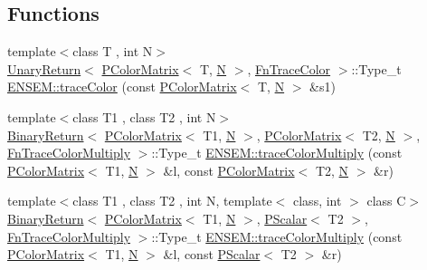 \subsection*{Functions}
\begin{DoxyCompactItemize}
\item 
{\footnotesize template$<$class T , int N$>$ }\\\mbox{\hyperlink{structENSEM_1_1UnaryReturn}{Unary\+Return}}$<$ \mbox{\hyperlink{classENSEM_1_1PColorMatrix}{P\+Color\+Matrix}}$<$ T, \mbox{\hyperlink{operator__name__util_8cc_a7722c8ecbb62d99aee7ce68b1752f337}{N}} $>$, \mbox{\hyperlink{structENSEM_1_1FnTraceColor}{Fn\+Trace\+Color}} $>$\+::Type\+\_\+t \mbox{\hyperlink{group__primcolormatrix_ga00fd94578bee0c90e298c41c144c15ee}{E\+N\+S\+E\+M\+::trace\+Color}} (const \mbox{\hyperlink{classENSEM_1_1PColorMatrix}{P\+Color\+Matrix}}$<$ T, \mbox{\hyperlink{operator__name__util_8cc_a7722c8ecbb62d99aee7ce68b1752f337}{N}} $>$ \&s1)
\item 
{\footnotesize template$<$class T1 , class T2 , int N$>$ }\\\mbox{\hyperlink{structENSEM_1_1BinaryReturn}{Binary\+Return}}$<$ \mbox{\hyperlink{classENSEM_1_1PColorMatrix}{P\+Color\+Matrix}}$<$ T1, \mbox{\hyperlink{operator__name__util_8cc_a7722c8ecbb62d99aee7ce68b1752f337}{N}} $>$, \mbox{\hyperlink{classENSEM_1_1PColorMatrix}{P\+Color\+Matrix}}$<$ T2, \mbox{\hyperlink{operator__name__util_8cc_a7722c8ecbb62d99aee7ce68b1752f337}{N}} $>$, \mbox{\hyperlink{structENSEM_1_1FnTraceColorMultiply}{Fn\+Trace\+Color\+Multiply}} $>$\+::Type\+\_\+t \mbox{\hyperlink{group__primcolormatrix_ga690c734a59a0c81041165c0fe948ef2d}{E\+N\+S\+E\+M\+::trace\+Color\+Multiply}} (const \mbox{\hyperlink{classENSEM_1_1PColorMatrix}{P\+Color\+Matrix}}$<$ T1, \mbox{\hyperlink{operator__name__util_8cc_a7722c8ecbb62d99aee7ce68b1752f337}{N}} $>$ \&l, const \mbox{\hyperlink{classENSEM_1_1PColorMatrix}{P\+Color\+Matrix}}$<$ T2, \mbox{\hyperlink{operator__name__util_8cc_a7722c8ecbb62d99aee7ce68b1752f337}{N}} $>$ \&r)
\item 
{\footnotesize template$<$class T1 , class T2 , int N, template$<$ class, int $>$ class C$>$ }\\\mbox{\hyperlink{structENSEM_1_1BinaryReturn}{Binary\+Return}}$<$ \mbox{\hyperlink{classENSEM_1_1PColorMatrix}{P\+Color\+Matrix}}$<$ T1, \mbox{\hyperlink{operator__name__util_8cc_a7722c8ecbb62d99aee7ce68b1752f337}{N}} $>$, \mbox{\hyperlink{classENSEM_1_1PScalar}{P\+Scalar}}$<$ T2 $>$, \mbox{\hyperlink{structENSEM_1_1FnTraceColorMultiply}{Fn\+Trace\+Color\+Multiply}} $>$\+::Type\+\_\+t \mbox{\hyperlink{group__primcolormatrix_gac1ebb50e5da5705b401fc6a361b951c5}{E\+N\+S\+E\+M\+::trace\+Color\+Multiply}} (const \mbox{\hyperlink{classENSEM_1_1PColorMatrix}{P\+Color\+Matrix}}$<$ T1, \mbox{\hyperlink{operator__name__util_8cc_a7722c8ecbb62d99aee7ce68b1752f337}{N}} $>$ \&l, const \mbox{\hyperlink{classENSEM_1_1PScalar}{P\+Scalar}}$<$ T2 $>$ \&r)

\end{DoxyCompactItemize}

